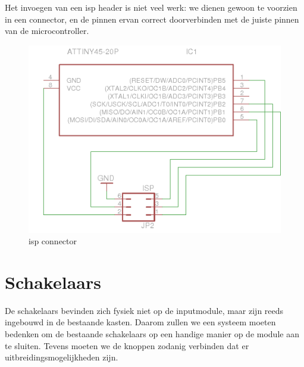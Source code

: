 Het invoegen van een \ac{isp} header is niet veel werk: we dienen gewoon te voorzien in een connector, en de pinnen ervan correct doorverbinden met de juiste pinnen van de microcontroller.

\begin{figure}
	\includegraphics[width=\textwidth]{afbeeldingen/inputmodule_isp}
	\caption{\acs{isp} connector}
\end{figure}

\section{Schakelaars}
\label{inputmodule:hardware:schakelaars}

De schakelaars bevinden zich fysiek niet op de inputmodule, maar zijn reeds ingebouwd in de bestaande kasten. Daarom zullen we een systeem moeten bedenken om de bestaande schakelaars op een handige manier op de module aan te sluiten. Tevens moeten we de knoppen zodanig verbinden dat er uitbreidingsmogelijkheden zijn.


